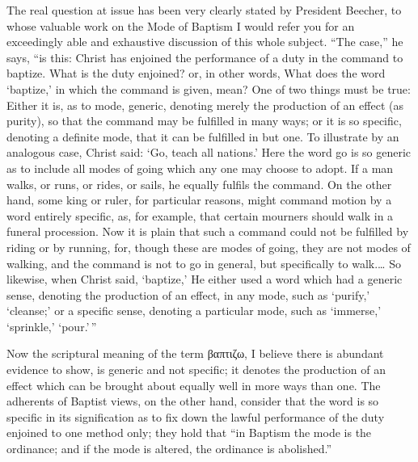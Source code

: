 \documentclass[]{book}
\begin{document}
The real question at issue has been very clearly stated by President Beecher, to whose valuable work on the Mode of Baptism I would refer you for an exceedingly able and exhaustive discussion of this whole subject. ``The case,'' he says, ``is this: Christ has enjoined the performance of a duty in the command to baptize. What is the duty enjoined? or, in other words, What does the word `baptize,' in which the command is given, mean? One of two things must be true: Either it is, as to mode, generic, denoting merely the production of an effect (as purity), so that the command may be fulfilled in many ways; or it is so specific, denoting a definite mode, that it can be fulfilled in but one. To illustrate by an analogous case, Christ said: `Go, teach all nations.' Here the word go is so generic as to include all modes of going which any one may choose to adopt. If a man walks, or runs, or rides, or sails, he equally fulfils the command. On the other hand, some king or ruler, for particular reasons, might command motion by a word entirely specific, as, for example, that certain mourners should walk in a funeral procession. Now it is plain that such a command could not be fulfilled by riding or by running, for, though these are modes of going, they are not modes of walking, and the command is not to go in general, but specifically to walk.\ldots{} So likewise, when Christ said, `baptize,' He either used a word which had a generic sense, denoting the production of an effect, in any mode, such as `purify,' `cleanse;' or a specific sense, denoting a particular mode, such as `immerse,' `sprinkle,' `pour.'\,''

Now the scriptural meaning of the term βαπτιζω, I believe there is abundant evidence to show, is generic and not specific; it denotes the production of an effect which can be brought about equally well in more ways than one. The adherents of Baptist views, on the other hand, consider that the word is so specific in its signification as to fix down the lawful performance of the duty enjoined to one method only; they hold that ``in Baptism the mode is the ordinance; and if the mode is altered, the ordinance is abolished.''
\end{document}
